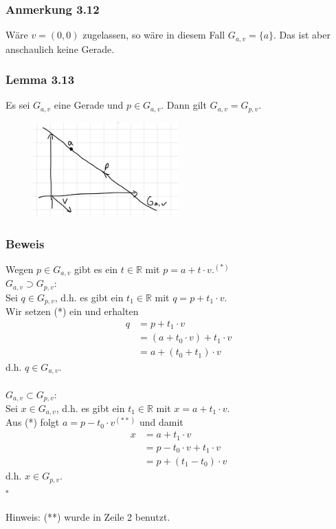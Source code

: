 \documentclass{article}
\begin{document}
\subsubsection*{Anmerkung 3.12}
Wäre $v=(0,0)$ zugelassen, so wäre in diesem Fall $G_{a,v} = \{a\}$. Das ist aber anschaulich keine Gerade. \\

\subsubsection*{Lemma 3.13}
Es sei $G_{a,v}$ eine Gerade und $p \in G_{a,v}$. Dann gilt $G_{a,v} = G_{p,v}$. \\
\begin{figure}[h]
    \centering
    \includegraphics[width=0.5\textwidth]{Images/3.13.jpeg}

\end{figure}

\subsubsection*{Beweis}
Wegen $p \in G_{a,v}$ gibt es ein $t \in \mathbb{R}$ mit $p = a + t \cdot v.^{(*)}$
\\
\underline{\textit{$G_{a,v} \supset G_{p,v}$}}: \\
Sei $q \in G_{p,v}$, d.h. es gibt ein $t_1 \in \mathbb{R}$ mit $q = p + t_1 \cdot v$. \\
Wir setzen (*) ein und erhalten \\
\begin{align*}
    q &= p + t_1 \cdot v \\
    &= (a + t_0 \cdot v) + t_1 \cdot v \\
    &= a + (t_0 + t_1) \cdot v
\end{align*}
d.h. $q \in G_{a,v}$. \\
\\
\underline{\textit{$G_{a,v} \subset G_{p,v}$}}: \\
Sei $x \in G_{a,v}$, d.h. es gibt ein $t_1 \in \mathbb{R}$ mit $x = a + t_1 \cdot v$. \\
Aus (*) folgt $a=p-t_0 \cdot v^{(**)}$ und damit \\
\begin{align*}
    x &= a + t_1 \cdot v \\
    &= p - t_0 \cdot v + t_1 \cdot v \\
    &= p + (t_1 - t_0) \cdot v
\end{align*}
d.h. $x \in G_{p,v}$. \\
$\square$ \\
\\
Hinweis: (**) wurde in Zeile 2 benutzt. \\
\\
\end{document}
